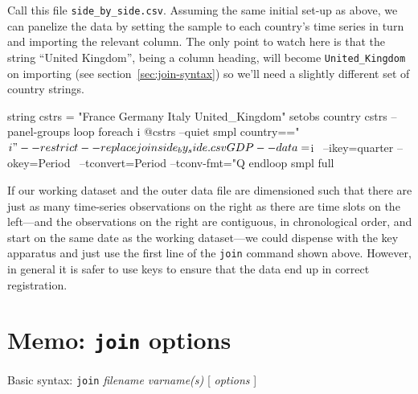 Call this file \verb|side_by_side.csv|.  Assuming the same initial
set-up as above, we can panelize the data by setting the sample to
each country's time series in turn and importing the relevant
column. The only point to watch here is that the string ``United
Kingdom'', being a column heading, will become \verb|United_Kingdom|
on importing (see section~\ref{sec:join-syntax}) so we'll need a
slightly different set of country strings.
%
\begin{code}
string cstrs = "France Germany Italy United_Kingdom"
setobs country cstrs --panel-groups
loop foreach i @cstrs --quiet
  smpl country=="$i" --restrict --replace
  join side_by_side.csv GDP --data=$i \
  --ikey=quarter --okey=Period \
  --tconvert=Period --tconv-fmt="Q%
endloop
smpl full
\end{code}

If our working dataset and the outer data file are dimensioned such
that there are just as many time-series observations on the right as
there are time slots on the left---and the observations on the right
are contiguous, in chronological order, and start on the same date as
the working dataset---we could dispense with the key apparatus and
just use the first line of the \texttt{join} command shown
above. However, in general it is safer to use keys to ensure that the
data end up in correct registration.

\section{Memo: \texttt{join} options}
\label{sec:join-options}

Basic syntax: \texttt{join} \textsl{filename} \textsl{varname(s)} [
\textsl{options} ]

